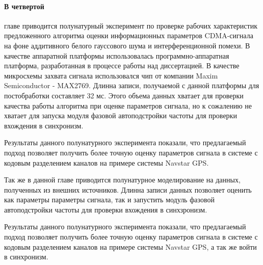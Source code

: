 \paragraph{В четвертой} главе приводится полунатурный эксперимент по проверке рабочих характеристик предложенного алгоритма
оценки информационных параметров CDMA-сигнала на фоне аддитивного белого гауссового шума и интерференционной помехи.
В качестве аппаратной платформы использовалась программно-аппаратная платформа, разработанная в процессе работы над диссертацией.
В качестве микросхемы захвата сигнала использовался чип от компании Maxim Semiconductor - MAX2769. Длинна записи, получаемой
с данной платформы для постобработки составляет 32 мс. Этого объема данных хватает для проверки качества работы алгоритма при оценке
параметров сигнала, но к сожалению не хватает для запуска модуля фазовой автоподстройки частоты для проверки вхождения в синхронизм.

Результаты данного полунатурного эксперимента показали, что предлагаемый подход позволяет получить более точную оценку параметров
сигнала в системе с кодовым разделением каналов на примере системы Navstar GPS.



Так же в данной главе приводится полунатурное моделирование на данных, полученных из внешних источников. Длинна записи данных
позволяет оценить как параметры параметры сигнала, так и запустить модуль фазовой автоподстройки частоты для проверки вхождения в синхзронизм.

Результаты данного полунатурного эксперимента показали, что предлагаемый подход позволяет получить более точную оценку параметров
сигнала в системе с кодовым разделением каналов на примере системы Navstar GPS, а так же войти в синхронизм.


